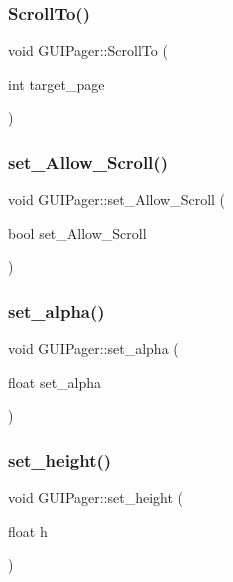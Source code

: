\subsubsection{\texorpdfstring{Scroll\+To()}{ScrollTo()}}
{\footnotesize\ttfamily void G\+U\+I\+Pager\+::\+Scroll\+To (\begin{DoxyParamCaption}\item[{int}]{target\+\_\+page }\end{DoxyParamCaption})}

\hypertarget{class_g_u_i_pager_a8cfd81bfcf8c2eeb8a5420651e82be14}{}\label{class_g_u_i_pager_a8cfd81bfcf8c2eeb8a5420651e82be14} 
\subsubsection{\texorpdfstring{set\+\_\+\+Allow\+\_\+\+Scroll()}{set\_Allow\_Scroll()}}
{\footnotesize\ttfamily void G\+U\+I\+Pager\+::set\+\_\+\+Allow\+\_\+\+Scroll (\begin{DoxyParamCaption}\item[{bool}]{set\+\_\+\+Allow\+\_\+\+Scroll }\end{DoxyParamCaption})}

\hypertarget{class_g_u_i_pager_a9b9f85507600c1ef1bae096bad947dea}{}\label{class_g_u_i_pager_a9b9f85507600c1ef1bae096bad947dea} 
\subsubsection{\texorpdfstring{set\+\_\+alpha()}{set\_alpha()}}
{\footnotesize\ttfamily void G\+U\+I\+Pager\+::set\+\_\+alpha (\begin{DoxyParamCaption}\item[{float}]{set\+\_\+alpha }\end{DoxyParamCaption})}

\hypertarget{class_g_u_i_pager_a3ff7d05c94251636e192838e11cddd36}{}\label{class_g_u_i_pager_a3ff7d05c94251636e192838e11cddd36} 
\subsubsection{\texorpdfstring{set\+\_\+height()}{set\_height()}}
{\footnotesize\ttfamily void G\+U\+I\+Pager\+::set\+\_\+height (\begin{DoxyParamCaption}\item[{float}]{h }\end{DoxyParamCaption})}

